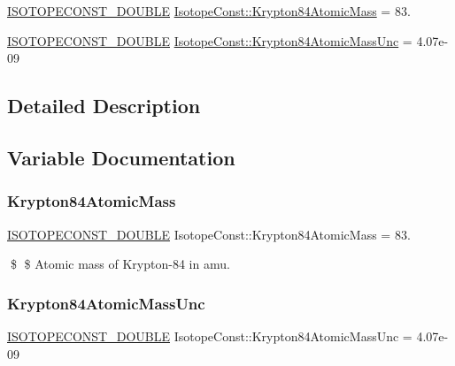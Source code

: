 \begin{DoxyCompactItemize}
\item 
\mbox{\hyperlink{group___isotope_const-_macros_ga8f45a7272ce02c0b4c65c44636ed719a}{I\+S\+O\+T\+O\+P\+E\+C\+O\+N\+S\+T\+\_\+\+D\+O\+U\+B\+LE}} \mbox{\hyperlink{group___isotope_const-_krypton-_kr84_ga3efa83ff85fdc48fee1aa3d1ee03a91e}{Isotope\+Const\+::\+Krypton84\+Atomic\+Mass}} = 83.
\item 
\mbox{\hyperlink{group___isotope_const-_macros_ga8f45a7272ce02c0b4c65c44636ed719a}{I\+S\+O\+T\+O\+P\+E\+C\+O\+N\+S\+T\+\_\+\+D\+O\+U\+B\+LE}} \mbox{\hyperlink{group___isotope_const-_krypton-_kr84_gaea1c28e1b788bc4130a12fc7865f7eba}{Isotope\+Const\+::\+Krypton84\+Atomic\+Mass\+Unc}} = 4.\+07e-\/09
\end{DoxyCompactItemize}


\subsection{Detailed Description}


\subsection{Variable Documentation}
\mbox{\label{group___isotope_const-_krypton-_kr84_ga3efa83ff85fdc48fee1aa3d1ee03a91e}} 
\subsubsection{\texorpdfstring{Krypton84\+Atomic\+Mass}{Krypton84AtomicMass}}
{\footnotesize\ttfamily \mbox{\hyperlink{group___isotope_const-_macros_ga8f45a7272ce02c0b4c65c44636ed719a}{I\+S\+O\+T\+O\+P\+E\+C\+O\+N\+S\+T\+\_\+\+D\+O\+U\+B\+LE}} Isotope\+Const\+::\+Krypton84\+Atomic\+Mass = 83.}

\$ \$ Atomic mass of Krypton-\/84 in amu. \mbox{\label{group___isotope_const-_krypton-_kr84_gaea1c28e1b788bc4130a12fc7865f7eba}} 
\subsubsection{\texorpdfstring{Krypton84\+Atomic\+Mass\+Unc}{Krypton84AtomicMassUnc}}
{\footnotesize\ttfamily \mbox{\hyperlink{group___isotope_const-_macros_ga8f45a7272ce02c0b4c65c44636ed719a}{I\+S\+O\+T\+O\+P\+E\+C\+O\+N\+S\+T\+\_\+\+D\+O\+U\+B\+LE}} Isotope\+Const\+::\+Krypton84\+Atomic\+Mass\+Unc = 4.\+07e-\/09}

